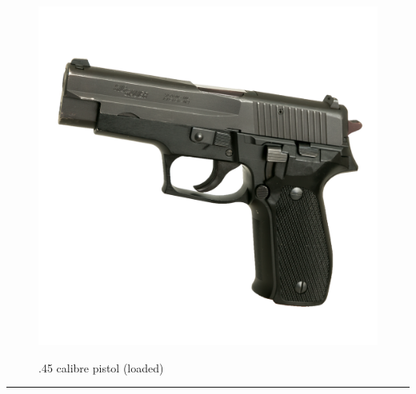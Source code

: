 \documentclass{article}
\begin{document}
    \begin{figure}[H]
        \centering
        \begin{minipage}{0.25\textwidth}
            \centering
            \includegraphics[width=\textwidth]{../SurvivalItemImages/pistol}
        \end{minipage}\hfill
        \begin{minipage}{0.7\textwidth}
            \centering
            \Large .45 calibre pistol (loaded)
        \end{minipage}
    \end{figure}
    \vspace{-0.8em}
    \noindent\rule{\textwidth}{0.4pt}
            
\end{document}
